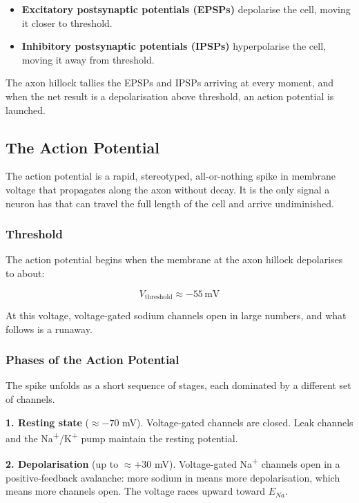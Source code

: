 \documentclass[11pt]{article}
\begin{document}
\begin{itemize}
    \item \textbf{Excitatory postsynaptic potentials (EPSPs)} depolarise the cell, moving it closer to threshold.
    \item \textbf{Inhibitory postsynaptic potentials (IPSPs)} hyperpolarise the cell, moving it away from threshold.
\end{itemize}

The axon hillock tallies the EPSPs and IPSPs arriving at every moment, and when the net result is a depolarisation above threshold, an action potential is launched.

\subsection{The Action Potential}

The action potential is a rapid, stereotyped, all-or-nothing spike in membrane voltage that propagates along the axon without decay. It is the only signal a neuron has that can travel the full length of the cell and arrive undiminished.

\subsubsection{Threshold}

The action potential begins when the membrane at the axon hillock depolarises to about:

\[
V_{\text{threshold}} \approx -55 \, \text{mV}
\]

At this voltage, voltage-gated sodium channels open in large numbers, and what follows is a runaway.

\subsubsection{Phases of the Action Potential}

The spike unfolds as a short sequence of stages, each dominated by a different set of channels.

\textbf{1. Resting state} ($\approx -70$ mV). Voltage-gated channels are closed. Leak channels and the Na\textsuperscript{+}/K\textsuperscript{+} pump maintain the resting potential.

\textbf{2. Depolarisation} (up to $\approx +30$ mV). Voltage-gated Na\textsuperscript{+} channels open in a positive-feedback avalanche: more sodium in means more depolarisation, which means more channels open. The voltage races upward toward $E_{Na}$.
\end{document}
